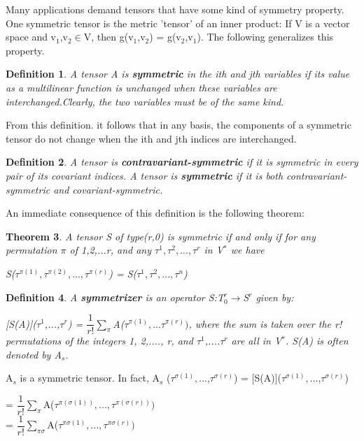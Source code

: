 \documentclass[12pt,a4paper]{article}
\newtheorem{thm}{Theorem}
\newtheorem{defn}[thm]{Definition}
\begin{document}
Many applications demand tensors that have some kind of symmetry property. One symmetric tensor is the metric 'tensor' of an inner product: If V is a vector space  and v$_1$,v$_2$$\in$V, then g(v$_1$,v$_2$) = g(v$_2$,v$_1$). The following generalizes this property.
\begin{defn}
A tensor A is \textbf{symmetric} in the ith and jth variables if its value as a multilinear function is unchanged when these variables are interchanged.Clearly, the two variables must be of the same kind.
\end{defn}
\hspace{1cm} From this definition. it follows that in any basis, the components of a symmetric tensor do not change when the ith and jth indices are interchanged.
\begin{defn}
A tensor is \textbf{contravariant-symmetric} if it is symmetric in every pair of its covariant indices. A tensor is \textbf{symmetric} if it is both contravariant-symmetric and covariant-symmetric.
\end{defn}
\hspace{1cm} An immediate consequence of this definition is the following theorem:
\begin{thm}
A tensor S of type(r,0) is symmetric if and only if for any permutation $\pi$ of 1,2,...r, and any $\tau^1,\tau^2,...,\tau^r$ in V$^*$ we have \begin{center}
S($\tau^{\pi(1)},\tau^{\pi(2)},...,\tau^{\pi(r)}$) = S($\tau^1,\tau^2,...,\tau^n$)
\end{center}
\end{thm}
\begin{defn}
A \textbf{symmetrizer} is an operator S:T$_0^r\to$S$^r$ given by:\begin{center}
[S(A)]($\tau^1$,...,$\tau^r$) = $\dfrac{1}{r!}$$\sum_{\pi}$A($\tau^{\pi(1)},...\tau^{\pi(r)})$, where the sum is taken over the r! permutations of the integers 1, 2,...., r, and $\tau^1$,....$\tau^r$ are all in V$^*$. S(A) is often denoted by A$_s$.
\end{center}
\end{defn}
A$_s$ is a symmetric tensor. In fact,
A$_s$ ($\tau^{\sigma(1)},$...,$\tau^{\sigma(r)}$) =
[S(A)]($\tau^{\sigma(1)},$...,$\tau^{\sigma(r)}$)\\
\begin{flushright}
= $\dfrac{1}{r!}$$\sum_\pi$A($\tau^{\pi(\sigma(1))},...,\tau^{\pi(\sigma(r))})$\\
= $\dfrac{1}{r!}$$\sum_{\pi\sigma}$A($\tau^{\pi\sigma(1)},...,\tau^{\pi\sigma(r)})$\\

\end{flushright}$$
\end{document}
